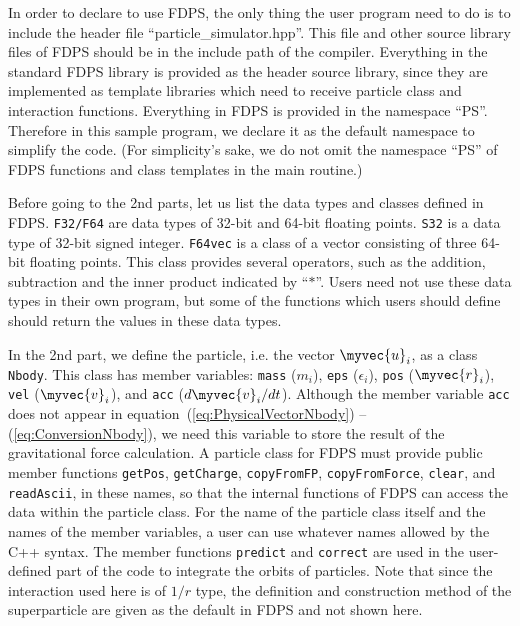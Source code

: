 In order to declare to use FDPS, the only thing the user program need
to do is to include the header file ``particle\_simulator.hpp''. This
file and other source library files of FDPS should be in the include
path of the compiler. Everything in the standard FDPS library is
provided as the header source library, since they are implemented as
template libraries which need to receive particle class and
interaction functions. Everything in FDPS is provided in the namespace
``PS''. Therefore in this sample program, we declare it as the default
namespace to simplify the code. (For simplicity's sake, we do not omit
the namespace ``PS'' of FDPS functions and class templates in the main
routine.)

Before going to the 2nd parts, let us list the data types and classes
defined in FDPS. \texttt{F32/F64} are data types of 32-bit and 64-bit
floating points. \texttt{S32} is a data type of 32-bit signed integer.
\texttt{F64vec} is a class of a vector consisting of three 64-bit
floating points. This class provides several operators, such as the
addition, subtraction and the inner product indicated by ``$*$''.
Users need not use these data types in their own program, but some of
the functions which users should define should return the values in
these data types.

In the 2nd part, we define the particle, i.e. the vector
$\myvec{u}_i$, as a class \texttt{Nbody}. This class has member
variables: \texttt{mass} ($m_i$), \texttt{eps}
($\epsilon_i$), \texttt{pos} ($\myvec{r}_i$), \texttt{vel}
($\myvec{v}_i$), and \texttt{acc} ($d\myvec{v}_i/dt$). Although the
member variable \texttt{acc} does not appear in
equation~(\ref{eq:PhysicalVectorNbody}) -- (\ref{eq:ConversionNbody}),
we need this variable to store the result of the gravitational force
calculation. A particle class for FDPS must provide public member
functions \texttt{getPos}, \texttt{getCharge}, \texttt{copyFromFP},
\texttt{copyFromForce}, \texttt{clear},
and \texttt{readAscii}, in these names, so that the internal functions
of FDPS can access the data within the particle class.  For the name
of the particle class itself and the names of the member variables, a
user can use whatever names allowed by the C++ syntax.  The member
functions \texttt{predict} and \texttt{correct} are used in the
user-defined part of the code to integrate the orbits of particles.
Note that since the interaction used here is of $1/r$ type, the
definition and construction method of the superparticle are given as
the default in FDPS and not shown here.

